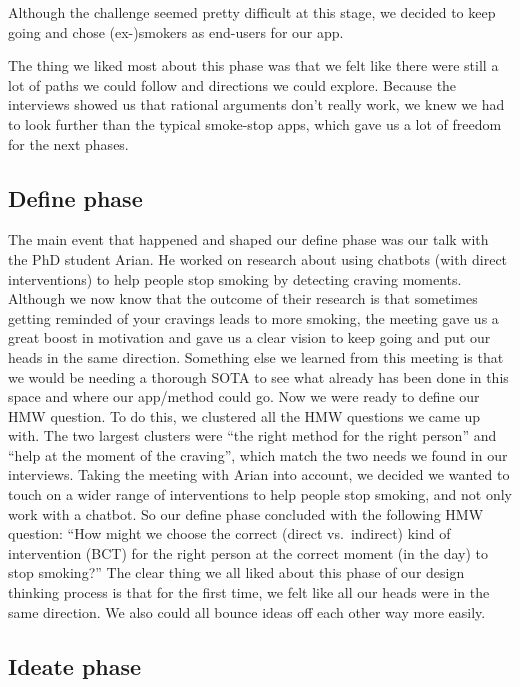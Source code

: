 Although the challenge seemed pretty difficult at this stage, we decided to keep going and chose (ex-)smokers as end-users for our app.

The thing we liked most about this phase was that we felt like there were still a lot of paths we could follow and directions we could explore.
Because the interviews showed us that rational arguments don't really work, we knew we had to look further than the typical smoke-stop apps, which gave us a lot of freedom for the next phases.

\subsection{Define phase}
\label{subsec:define}

The main event that happened and shaped our define phase was our talk with the PhD student Arian.
He worked on research about using chatbots (with direct interventions) to help people stop smoking by detecting craving moments.
Although we now know that the outcome of their research is that sometimes getting reminded of your cravings leads to more smoking, the meeting gave us a great boost in motivation and gave us a clear vision to keep going and put our heads in the same direction.
Something else we learned from this meeting is that we would be needing a thorough SOTA to see what already has been done in this space and where our app/method could go.
Now we were ready to define our HMW question.
To do this, we clustered all the HMW questions we came up with.
The two largest clusters were ``the right method for the right person'' and ``help at the moment of the craving'', which match the two needs we found in our interviews.
Taking the meeting with Arian into account, we decided we wanted to touch on a wider range of interventions to help people stop smoking, and not only work with a chatbot.
So our define phase concluded with the following HMW question: ``How might we choose the correct (direct vs.\ indirect) kind of intervention (BCT) for the right person at the correct moment (in the day) to stop smoking?''
The clear thing we all liked about this phase of our design thinking process is that for the first time, we felt like all our heads were in the same direction.
We also could all bounce ideas off each other way more easily.

\subsection{Ideate phase}
\label{subsec:ideate}

